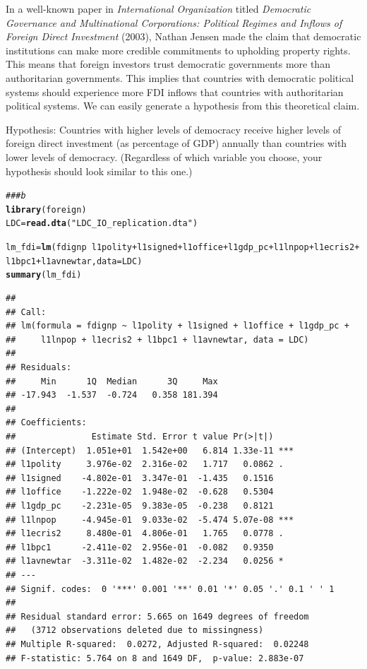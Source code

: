 \documentclass[12pt]{article}\usepackage[]{graphicx}\usepackage[]{color}
\makeatletter
\newcommand{\hlstr}[1]{\textcolor[rgb]{0.192,0.494,0.8}{#1}}%
\newcommand{\hlcom}[1]{\textcolor[rgb]{0.678,0.584,0.686}{\textit{#1}}}%
\newcommand{\hlopt}[1]{\textcolor[rgb]{0,0,0}{#1}}%
\newcommand{\hlstd}[1]{\textcolor[rgb]{0.345,0.345,0.345}{#1}}%
\newcommand{\hlkwb}[1]{\textcolor[rgb]{0.69,0.353,0.396}{#1}}%
\newcommand{\hlkwc}[1]{\textcolor[rgb]{0.333,0.667,0.333}{#1}}%
\newcommand{\hlkwd}[1]{\textcolor[rgb]{0.737,0.353,0.396}{\textbf{#1}}}%
\newenvironment{kframe}{%
 \def\at@end@of@kframe{}%
 \ifinner\ifhmode%
  \def\at@end@of@kframe{\end{minipage}}%
  \begin{minipage}{\columnwidth}%
 \fi\fi%
 \def\FrameCommand##1{\hskip\@totalleftmargin \hskip-\fboxsep
 \colorbox{shadecolor}{##1}\hskip-\fboxsep
     \hskip-\linewidth \hskip-\@totalleftmargin \hskip\columnwidth}%
 \MakeFramed {\advance\hsize-\width
   \@totalleftmargin\z@ \linewidth\hsize
   \@setminipage}}%
 {\par\unskip\endMakeFramed%
 \at@end@of@kframe}
\newenvironment{knitrout}{}{} %
\makeatother
\begin{document}
In a well-known paper in \textit{International Organization} titled \textit{Democratic Governance and Multinational Corporations: Political Regimes and Inflows of Foreign Direct Investment} (2003), Nathan Jensen made the claim that democratic institutions can make more credible commitments to upholding property rights. This means that foreign investors trust democratic governments more than authoritarian governments. This implies that countries with democratic political systems should experience more FDI inflows that countries with authoritarian political systems. We can easily generate a hypothesis from this theoretical claim.

Hypothesis: Countries with higher levels of democracy receive higher levels of foreign direct investment (as percentage of GDP) annually than countries with lower levels of democracy. (Regardless of which variable you choose, your hypothesis should look similar to this one.)

\begin{knitrout}
\color{fgcolor}\begin{kframe}
\begin{alltt}
\hlcom{### b}
\hlkwd{library}\hlstd{(foreign)}
\hlstd{LDC} \hlkwb{=} \hlkwd{read.dta}\hlstd{(}\hlstr{"LDC_IO_replication.dta"}\hlstd{)}

\hlstd{lm_fdi} \hlkwb{=} \hlkwd{lm}\hlstd{(fdignp} \hlopt{~} \hlstd{l1polity} \hlopt{+} \hlstd{l1signed} \hlopt{+} \hlstd{l1office} \hlopt{+} \hlstd{l1gdp_pc} \hlopt{+} \hlstd{l1lnpop} \hlopt{+} \hlstd{l1ecris2} \hlopt{+}
    \hlstd{l1bpc1} \hlopt{+} \hlstd{l1avnewtar,} \hlkwc{data} \hlstd{= LDC)}
\hlkwd{summary}\hlstd{(lm_fdi)}
\end{alltt}
\begin{verbatim}
## 
## Call:
## lm(formula = fdignp ~ l1polity + l1signed + l1office + l1gdp_pc + 
##     l1lnpop + l1ecris2 + l1bpc1 + l1avnewtar, data = LDC)
## 
## Residuals:
##     Min      1Q  Median      3Q     Max 
## -17.943  -1.537  -0.724   0.358 181.394 
## 
## Coefficients:
##               Estimate Std. Error t value Pr(>|t|)    
## (Intercept)  1.051e+01  1.542e+00   6.814 1.33e-11 ***
## l1polity     3.976e-02  2.316e-02   1.717   0.0862 .  
## l1signed    -4.802e-01  3.347e-01  -1.435   0.1516    
## l1office    -1.222e-02  1.948e-02  -0.628   0.5304    
## l1gdp_pc    -2.231e-05  9.383e-05  -0.238   0.8121    
## l1lnpop     -4.945e-01  9.033e-02  -5.474 5.07e-08 ***
## l1ecris2     8.480e-01  4.806e-01   1.765   0.0778 .  
## l1bpc1      -2.411e-02  2.956e-01  -0.082   0.9350    
## l1avnewtar  -3.311e-02  1.482e-02  -2.234   0.0256 *  
## ---
## Signif. codes:  0 '***' 0.001 '**' 0.01 '*' 0.05 '.' 0.1 ' ' 1
## 
## Residual standard error: 5.665 on 1649 degrees of freedom
##   (3712 observations deleted due to missingness)
## Multiple R-squared:  0.0272,	Adjusted R-squared:  0.02248 
## F-statistic: 5.764 on 8 and 1649 DF,  p-value: 2.883e-07
\end{verbatim}
\end{kframe}
\end{knitrout}
\end{document}
